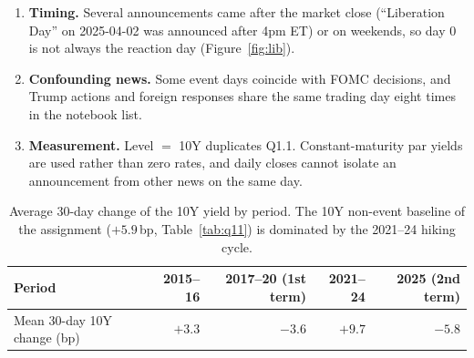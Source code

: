 \documentclass[11pt]{article}
\begin{document}
\begin{enumerate}[leftmargin=1.4em,itemsep=1pt]
August-2025 events are dropped and late-July windows are cut short.
\item \textbf{Timing.} Several announcements came after the market close
(``Liberation Day'' on 2025-04-02 was announced after 4pm ET) or on weekends,
so day 0 is not always the reaction day (Figure~\ref{fig:lib}).
\item \textbf{Confounding news.} Some event days coincide with FOMC
decisions, and Trump actions and foreign responses share the same trading day
eight times in the notebook list.
\item \textbf{Measurement.} Level $=$ 10Y duplicates Q1.1. Constant-maturity
par yields are used rather than zero rates, and daily closes cannot isolate an
announcement from other news on the same day.
\end{enumerate}

\begin{table}[!htbp]
\centering
\small
\begin{tabular}{lrrrr}
\toprule
Period & 2015--16 & 2017--20 (1st term) & 2021--24 & 2025 (2nd term) \\
\midrule
Mean 30-day 10Y change (bp) & $+3.3$ & $-3.6$ & $+9.7$ & $-5.8$ \\
\bottomrule
\end{tabular}
\caption{Average 30-day change of the 10Y yield by period. The 10Y non-event
baseline of the assignment ($+5.9$\,bp, Table~\ref{tab:q11}) is dominated by the 2021--24 hiking
cycle.}
\label{tab:drift}
\end{table}
\end{document}
